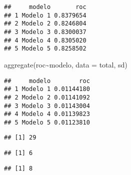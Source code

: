 \documentclass[
]{article}
\newenvironment{Shaded}{\begin{snugshade}}{\end{snugshade}}
\newcommand{\AttributeTok}[1]{\textcolor[rgb]{0.77,0.63,0.00}{#1}}
\newcommand{\CommentTok}[1]{\textcolor[rgb]{0.56,0.35,0.01}{\textit{#1}}}
\newcommand{\FunctionTok}[1]{\textcolor[rgb]{0.00,0.00,0.00}{#1}}
\newcommand{\NormalTok}[1]{#1}
\newcommand{\OtherTok}[1]{\textcolor[rgb]{0.56,0.35,0.01}{#1}}
\newcommand{\SpecialCharTok}[1]{\textcolor[rgb]{0.00,0.00,0.00}{#1}}
\begin{document}
\begin{verbatim}
##     modelo       roc
## 1 Modelo 1 0.8379654
## 2 Modelo 2 0.8246804
## 3 Modelo 3 0.8300037
## 4 Modelo 4 0.8305020
## 5 Modelo 5 0.8258502
\end{verbatim}

\begin{Shaded}
\begin{Highlighting}[]
\FunctionTok{aggregate}\NormalTok{(roc}\SpecialCharTok{\textasciitilde{}}\NormalTok{modelo, }\AttributeTok{data =}\NormalTok{ total, sd) }
\end{Highlighting}
\end{Shaded}

\begin{verbatim}
##     modelo        roc
## 1 Modelo 1 0.01144180
## 2 Modelo 2 0.01141092
## 3 Modelo 3 0.01143004
## 4 Modelo 4 0.01139823
## 5 Modelo 5 0.01123810
\end{verbatim}

\begin{Shaded}
\end{Shaded}

\begin{verbatim}
## [1] 29
\end{verbatim}

\begin{Shaded}
\end{Shaded}

\begin{verbatim}
## [1] 6
\end{verbatim}

\begin{Shaded}
\end{Shaded}

\begin{verbatim}
## [1] 8
\end{verbatim}
\end{document}
